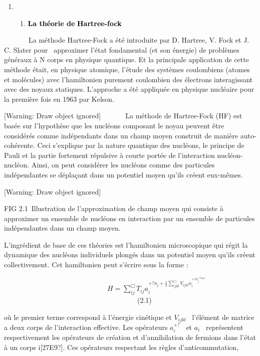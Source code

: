 \documentclass[a4paper]{article}
\begin{document}
\begin{enumerate}
\item \begin{enumerate}
\item \textbf{\textcolor{black}{La théorie de}}\textcolor{black}{ }\textbf{\textcolor{black}{Hartree-fock}}
\end{enumerate}
\end{enumerate}
\ \ \ \ \ \ \ La méthode Hartree-Fock a été introduite par D. Hartree, V. Fock et J. C. Slater pour \ approximer l'état
fondamental (et son énergie) de problèmes généraux à N corps en physique quantique. Et la principale application de
cette méthode était, en physique atomique, l'étude des systèmes coulombiens (atomes et molécules) avec l’hamiltonien
purement coulombien des électrons interagissant avec des noyaux statiques. L’approche a été appliquée en physique
nucléaire pour la première fois en 1963 par Kelson.

[Warning: Draw object ignored]\ \ \ \ \ \ \ La méthode de Hartree-Fock (HF) est basée sur l’hypothèse que les nucléons
composant le noyau peuvent être considérés comme indépendants dans un champ moyen construit de manière auto-cohérente.
Ceci s’explique par la nature quantique des nucléons, le principe de Pauli et la partie fortement répulsive à courte
portée de l’interaction nucléon-nucléon. Ainsi, on peut considérer les nucléons comme des particules indépendantes se
déplaçant dans un potentiel moyen qu’ils créent eux-mêmes. 

[Warning: Draw object ignored]

FIG 2.1~Illustration de l’approximation de champ moyen qui consiste à approximer un ensemble de nucléons en interaction
par un ensemble de particules indépendantes dans un champ moyen.

L’ingrédient de base de ces théories est l’hamiltonien microscopique qui régit la dynamique des nucléons individuels
plongés dans un potentiel moyen qu’ils créent collectivement. Cet hamiltonien peut s’écrire sous la forme : 


\bigskip

\textbf{\ \ \ \ \ \ \ \ \ \ \ \ \ \ \ \ \ \ \ \ \ \ \ \ \ } $H=\sum _{\mathit{ij}}^{\Box
}T_{\mathit{ij}}a_i^{+?a_j+\frac 1 4\sum _{\mathit{ijkl}}^{\Box
}V_{\mathit{ijkl}}a_i^{+?a_j^{+?a_ka_l}}}$\ \ \ \ \ \ \ \ \ \ \ \ \ \ \ \ \ \ \ \ \ \ \ \ \ \ \ \ \ \ \ \ \ \ \ \ \ \ (2.1)

où le premier terme correspond à l’énergie cinétique et  $V_{\mathit{ijkl}}$ \ l’élément de matrice a deux corps de
l’interaction effective. Les opérateurs  $a_i^{+?}$ \textit{\ }et  $a_i$ \ représentent respectivement les opérateurs
de création et d’annihilation de fermions dans l’état à un corps {\textbar}i[27E9?]. Ces opérateurs respectant les
règles d’anticommutation,
\end{document}
